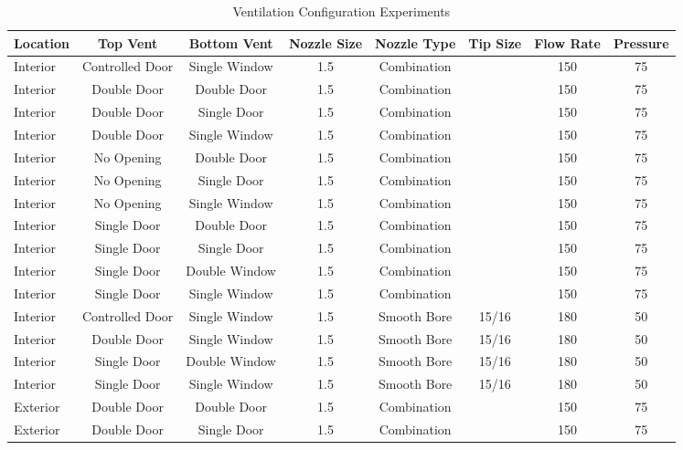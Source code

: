 \documentclass{article}
\begin{document}
\begin{table}[!ht]
\centering
\footnotesize
\caption{Ventilation Configuration Experiments}
\label{Ventilation_Configuration_Experiments}
\begin{tabular}{lccccccc}
\toprule[1.5pt]
\multicolumn{1}{c}{\textbf{Location}} & \multicolumn{1}{c}{\textbf{Top Vent}} & \multicolumn{1}{c}{\textbf{Bottom Vent}} & \multicolumn{1}{c}{\textbf{Nozzle Size}} & \multicolumn{1}{c}{\textbf{Nozzle Type}} & \multicolumn{1}{c}{\textbf{Tip Size}} & \multicolumn{1}{c}{\textbf{Flow Rate}} & \textbf{Pressure} \\ 
\midrule
Interior & Controlled Door & Single Window & 1.5 & Combination &  & 150 & 75 \\
Interior & Double Door & Double Door & 1.5 & Combination &  & 150 & 75 \\
Interior & Double Door & Single Door & 1.5 & Combination &  & 150 & 75 \\
Interior & Double Door & Single Window & 1.5 & Combination &  & 150 & 75 \\
Interior & No Opening & Double Door & 1.5 & Combination &  & 150 & 75 \\
Interior & No Opening & Single Door & 1.5 & Combination &  & 150 & 75 \\
Interior & No Opening & Single Window & 1.5 & Combination &  & 150 & 75 \\
Interior & Single Door & Double Door & 1.5 & Combination &  & 150 & 75 \\
Interior & Single Door & Single Door & 1.5 & Combination &  & 150 & 75 \\
Interior & Single Door & Double Window & 1.5 & Combination &  & 150 & 75 \\
Interior & Single Door & Single Window & 1.5 & Combination &  & 150 & 75 \\
Interior & Controlled Door & Single Window & 1.5 & Smooth Bore & 15/16 & 180 & 50 \\
Interior & Double Door & Single Window & 1.5 & Smooth Bore & 15/16 & 180 & 50 \\
Interior & Single Door & Double Window & 1.5 & Smooth Bore & 15/16 & 180 & 50 \\
Interior & Single Door & Single Window & 1.5 & Smooth Bore & 15/16 & 180 & 50 \\
Exterior & Double Door & Double Door & 1.5 & Combination &  & 150 & 75 \\
Exterior & Double Door & Single Door & 1.5 & Combination &  & 150 & 75 \\

\end{tabular}
\end{table}
\end{document}
